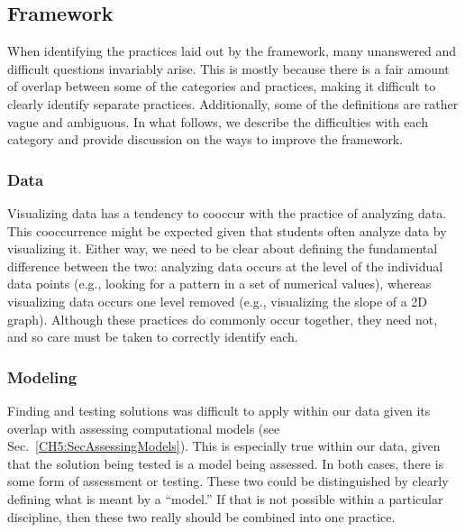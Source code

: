\documentclass{msuphddissertation}
\begin{document}
\begin{doublespace}

\subsection{Framework}

When identifying the practices laid out by the framework, many unanswered and difficult questions invariably arise.  This is mostly because there is a fair amount of overlap between some of the categories and practices, making it difficult to clearly identify separate practices.  Additionally, some of the definitions are rather vague and ambiguous.  In what follows, we describe the difficulties with each category and provide discussion on the ways to improve the framework.

\subsubsection{Data}

Visualizing data has a tendency to cooccur with the practice of analyzing data.  This cooccurrence might be expected given that students often analyze data by visualizing it.  Either way, we need to be clear about defining the fundamental difference between the two: analyzing data occurs at the level of the individual data points (e.g., looking for a pattern in a set of numerical values), whereas visualizing data occurs one level removed (e.g., visualizing the slope of a 2D graph).  Although these practices do commonly occur together, they need not, and so care must be taken to correctly identify each.

\subsubsection{Modeling}

Finding and testing solutions was difficult to apply within our data given its overlap with assessing computational models (see Sec.~\ref{CH5:SecAssessingModels}).  This is especially true within our data, given that the solution being tested is a model being assessed.  In both cases, there is some form of assessment or testing.  These two could be distinguished by clearly defining what is meant by a ``model.''  If that is not possible within a particular discipline, then these two really should be combined into one practice.


\end{doublespace}
\end{document}

